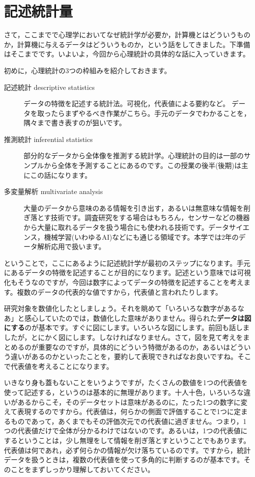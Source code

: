 \documentclass{ltjsbook}
\begin{document}
\VerbatimFootnotes
\chapter{記述統計量}
\label{ch05_descriptives}

さて，ここまでで心理学においてなぜ統計学が必要か，計算機とはどういうものか，計算機に与えるデータはどういうものか，という話をしてきました。下準備はそこまでです。いよいよ，今回から心理統計の具体的な話に入っていきます。

初めに，心理統計の3つの枠組みを紹介しておきます。
\begin{description}
	\item[記述統計 descriptive statistics] データの特徴を記述する統計法。可視化，代表値による要約など。 データを取ったらまずやるべき作業がこちら。手元のデータでわかることを，隅々まで書き表すのが狙いです。
	\item[推測統計 inferential statistics] 部分的なデータから全体像を推測する統計学。心理統計の目的は一部のサンプルから全体を予測することにあるのです。この授業の後半(後期)は主にこの話になります。
	\item[多変量解析 multivariate analysis] 大量のデータから意味のある情報を引き出す，あるいは無意味な情報を削ぎ落とす技術です。調査研究をする場合はもちろん，センサーなどの機器から大量に取れるデータを扱う場合にも使われる技術です。データサイエンス，機械学習(いわゆるAI)などにも通じる領域です。本学では2年のデータ解析応用で扱います。
\end{description}

ということで，ここにあるように記述統計学が最初のステップになります。手元にあるデータの特徴を記述することが目的になります。記述という意味では可視化もそうなのですが，今回は数字によってデータの特徴を記述することを考えます。複数のデータの代表的な値ですから，代表値と言われたりします。

研究対象を数値化したとしましょう。それを眺めて「いろいろな数字があるなあ」と感心していたのでは，数値化した意味がありません。得られた\textbf{データは図にする}のが基本です。すぐに図にします。いろいろな図にします。前回も話しましたが，とにかく図にします。しなければなりません。さて，図を見て考えをまとめるのが重要なのですが，具体的にどういう特徴があるのか，あるいはどういう違いがあるのかといったことを，要約して表現できればなお良いですね。そこで代表値を考えることになります。

いきなり身も蓋もないことをいうようですが，たくさんの数値を1つの代表値を使って記述する，というのは基本的に無理があります。十人十色，いろいろな違いがあるからこそ，そのデータセットは意味があるのに，たった1つの数字に変えて表現するのですから。代表値は，何らかの側面で評価することで1つに定まるものであって，あくまでもその評価次元での代表値に過ぎません。つまり，1つの代表値だけで全体が分かるわけではないのです。あるいは，1つの代表値にするということは，少し無理をして情報を削ぎ落とすということでもあります。代表値は何であれ，必ず何らかの情報が欠け落ちているのです。ですから，統計データを扱うときは，複数の代表値を使って多角的に判断するのが基本です。そのことをまずしっかり理解しておいてください。
\end{document}
